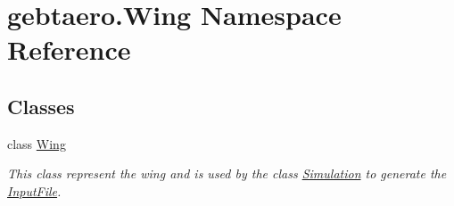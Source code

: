 \hypertarget{namespacegebtaero_1_1_wing}{}\section{gebtaero.\+Wing Namespace Reference}
\label{namespacegebtaero_1_1_wing}
\subsection*{Classes}
\begin{DoxyCompactItemize}
\item 
class \hyperlink{classgebtaero_1_1_wing_1_1_wing}{Wing}
\begin{DoxyCompactList}\small\item\em This class represent the wing and is used by the class \hyperlink{namespacegebtaero_1_1_simulation}{Simulation} to generate the \hyperlink{namespacegebtaero_1_1_input_file}{Input\+File}. \end{DoxyCompactList}\end{DoxyCompactItemize}

